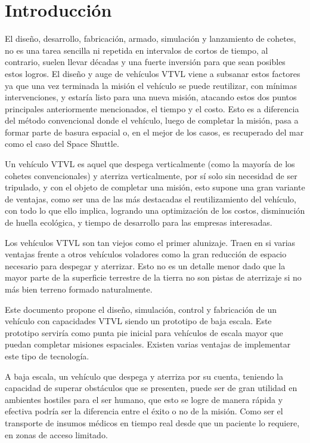 
\section{Introducción}
El diseño, desarrollo, fabricación, armado, simulación y lanzamiento de cohetes, no es una tarea
sencilla ni repetida en intervalos de cortos de tiempo, al contrario, suelen llevar décadas y una
fuerte inversión para que sean posibles estos logros. El diseño y auge de vehículos VTVL viene
a subsanar estos factores ya que una vez terminada la misión el vehículo se puede reutilizar,
con mínimas intervenciones, y estaría listo para una nueva misión, atacando estos dos puntos principales anteriormente mencionados, el tiempo y el costo. Esto es a diferencia del método convencional donde el vehículo, luego de completar la misión, pasa a formar parte de basura espacial o, en el mejor de los casos, es recuperado del mar como el caso del Space Shuttle. 

\medskip

Un vehículo VTVL es aquel que despega verticalmente (como la mayoría de los cohetes
convencionales) y aterriza verticalmente, por sí solo sin necesidad de ser tripulado, y con el
objeto de completar una misión, esto supone una gran variante de ventajas, como ser una de
las más destacadas el reutilizamiento del vehículo, con todo lo que ello implica, logrando una
optimización de los costos, disminución de huella ecológica, y tiempo de desarrollo para las empresas interesadas. %

\medskip

Los vehículos VTVL son tan viejos como el primer alunizaje. Traen en si varias ventajas frente a otros vehículos voladores como la gran reducción de espacio necesario para despegar y aterrizar. Esto no es un detalle menor dado que la mayor parte de la superficie terrestre de la tierra no son pistas de aterrizaje si no más bien terreno formado naturalmente.

\medskip

Este documento propone el diseño, simulación, control y fabricación de un vehículo con capacidades VTVL siendo un prototipo de baja escala. 
Este prototipo serviría como punta pie inicial
para vehículos de escala mayor que puedan completar misiones espaciales. Existen varias ventajas de implementar este tipo de tecnología.

\medskip

A baja escala, un vehículo que despega y aterriza por su cuenta, teniendo la capacidad de
superar obstáculos que se presenten, puede ser de gran utilidad en ambientes hostiles para el
ser humano, que esto se logre de manera rápida y efectiva podría ser la diferencia entre el
éxito o no de la misión.
Como ser el transporte de insumos médicos en tiempo real desde que un paciente lo requiere,
en zonas de acceso limitado.

